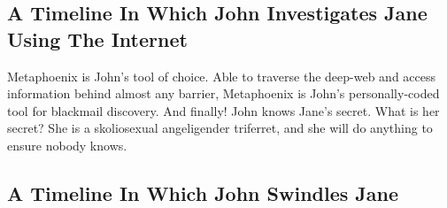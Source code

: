 \documentclass{article}
\begin{document}
\subsection{A Timeline In Which John Investigates Jane Using The Internet}


Metaphoenix is John's tool of choice. Able to traverse the deep{-}web and access information behind almost any barrier, Metaphoenix is John's personally{-}coded tool for blackmail discovery.
And finally!
John knows Jane's secret. What is her secret? She is a skoliosexual angeligender triferret, and she will do anything to ensure nobody knows.
\subsection{A Timeline In Which John Swindles Jane}
\end{document}
